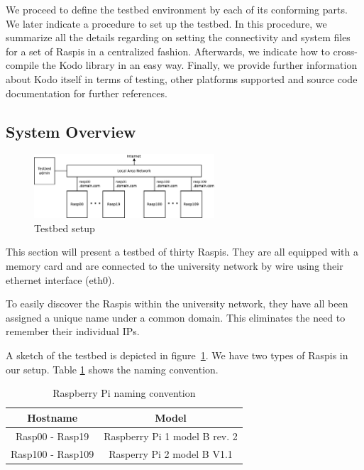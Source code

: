 \label{sec:testbed}

We proceed to define the testbed environment by each of its conforming
parts. We later indicate a procedure to set up the testbed. In this procedure,
we summarize all the details regarding on setting the connectivity and
system files for a set of \ac{Raspi}s in a centralized fashion.
Afterwards, we indicate how to cross-compile the Kodo library in an
easy way. Finally, we provide further information about Kodo itself in terms
of testing, other platforms supported and source code documentation
for further references.

\subsection{System Overview}


\begin{figure}[ht!]
\centering
\includegraphics[width=0.6\textwidth]{images/testbed_setup2.eps}
\caption{Testbed setup}
\label{fig:testbed_setup}
\end{figure}

This section will present a testbed of thirty \ac{Raspi}s.
They are all equipped with a memory card and are connected to the
university network by wire using their ethernet interface (eth0).

To easily discover the \ac{Raspi}s within the university network, they have all
been assigned a unique name under a common domain.
This eliminates the need to remember their individual \ac{IP}s.

A sketch of the testbed is depicted in figure~\ref{fig:testbed_setup}.
We have two types of \ac{Raspi}s in our setup.
Table \ref{tab:rasp_naming} shows the naming convention.

\begin{table}[ht!]
  \centering
  \begin{tabular}{|c|c|}
    \hline
      \textbf{Hostname} & \textbf{Model} \\ \hline
    Rasp00 - Rasp19 & Raspberry Pi 1 model B rev. 2 \\ \hline
    Rasp100 - Rasp109 & Rasperry Pi 2 model B V1.1 \\ \hline
  \end{tabular}
  \caption{Raspberry Pi naming convention}
  \label{tab:rasp_naming}
\end{table}




